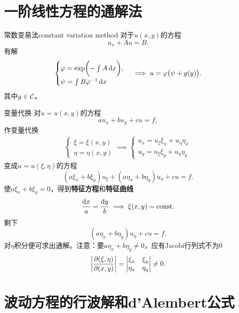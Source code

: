 \section{一阶线性方程的通解法}
\begin{method}{常数变易法}{constant variation method}
	对于$u(x,y)$的方程
	\[
		u_x + Au = B.
	\]
	有解
	\begin{equation}
		\label{eq:mmp-integrating-factor}
		\begin{cases}
			\varphi = \exp\biggl(-\int A\mathop{}\!\mathrm{d} x\biggr),  \\
			\psi = \int B\varphi^{-1}\mathop{}\!\mathrm{d} x
		\end{cases}
		\implies u = \varphi\bigl(\psi + g(y)\bigr).
	\end{equation}
	其中$g \in \mathcal{C}$。
\end{method}
\begin{method}{变量代换}
	对$u = u(x,y)$的方程
	\[
		au_x + bu_y + cu = f,
	\]
	作变量代换
	\begin{align*}
		\begin{cases}
			\xi = \xi(x,y)  \\
			\eta = \eta(x,y)
		\end{cases}
		\implies
		\begin{cases}
			u_x = u_\xi\xi_x + u_\eta\eta_x \\
			u_y = u_\xi\xi_y + u_\eta\eta_y
		\end{cases}
	\end{align*}
	变成$u = u(\xi,\eta)$的方程
	\[
		(a\xi_x + b\xi_y)u_\xi + (a\eta_x + b\eta_y)u_\eta + cu = f.
	\]
	使$a\xi_x + b\xi_y = 0$，得到\textbf{特征方程}和\textbf{特征曲线}
	\begin{align}
		\frac{\mathop{}\!\mathrm{d} x}a = \frac{\mathop{}\!\mathrm{d} y}b \implies \xi(x,y) = \mathrm{const}.
	\end{align}
	剩下
	\[
		(a\eta_x + b\eta_y)u_\eta + cu = f.
	\]
	对$\eta$积分便可求出通解。注意：要$a\eta_x + b\eta_y \neq 0$，应有Jacobi行列式不为0
	\begin{align*}
		\biggl\lvert\frac{\partial(\xi,\eta)}{\partial(x,y)}\biggr\rvert =
		\begin{vmatrix}
			\xi_x  & \xi_y  \\
			\eta_x & \eta_y
		\end{vmatrix} \neq 0.
	\end{align*}
\end{method}

\section{波动方程的行波解和d'Alembert公式}

